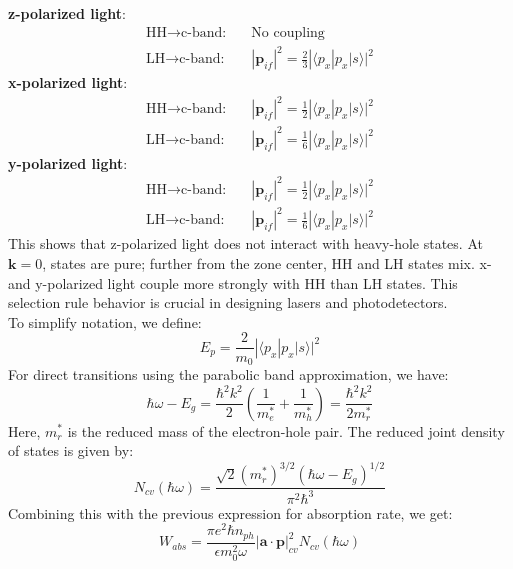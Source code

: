 \textbf{z-polarized light}:
\begin{align*}
	\text{HH} \rightarrow \text{c-band:} & \quad \text{No coupling}                                                  \\
	\text{LH} \rightarrow \text{c-band:} & \quad |\mathbf{p}_{if}|^2 = \frac{2}{3} |\langle p_x | p_x | s \rangle|^2
\end{align*}
\textbf{x-polarized light}:
\begin{align}
	\text{HH} \rightarrow \text{c-band:} & \quad |\mathbf{p}_{if}|^2 = \frac{1}{2} |\langle p_x | p_x | s \rangle|^2 \\
	\text{LH} \rightarrow \text{c-band:} & \quad |\mathbf{p}_{if}|^2 = \frac{1}{6} |\langle p_x | p_x | s \rangle|^2
\end{align}
\textbf{y-polarized light}:
\begin{align*}
	\text{HH} \rightarrow \text{c-band:} & \quad |\mathbf{p}_{if}|^2 = \frac{1}{2} |\langle p_x | p_x | s \rangle|^2 \\
	\text{LH} \rightarrow \text{c-band:} & \quad |\mathbf{p}_{if}|^2 = \frac{1}{6} |\langle p_x | p_x | s \rangle|^2
\end{align*}
This shows that z-polarized light does not interact with heavy-hole states. At \( \mathbf{k} = 0 \), states are pure; further from the zone center, HH and LH states mix. x- and y-polarized light couple more strongly with HH than LH states. This selection rule behavior is crucial in designing lasers and photodetectors.\\
To simplify notation, we define:
\begin{equation}
	E_p = \frac{2}{m_0} |\langle p_x | p_x | s \rangle|^2
\end{equation}
For direct transitions using the parabolic band approximation, we have:
\begin{equation}
	\hbar \omega - E_g = \frac{\hbar^2 k^2}{2} \left( \frac{1}{m_e^*} + \frac{1}{m_h^*} \right) = \frac{\hbar^2 k^2}{2 m_r^*}
\end{equation}
Here, \( m_r^* \) is the reduced mass of the electron-hole pair.
The reduced joint density of states is given by:
\begin{equation}
	N_{cv}(\hbar \omega) = \frac{\sqrt{2} (m_r^*)^{3/2} (\hbar \omega - E_g)^{1/2}}{\pi^2 \hbar^3}
\end{equation}
Combining this with the previous expression for absorption rate, we get:
\begin{equation}
	W_{abs} = \frac{\pi e^2 \hbar n_{ph}}{\epsilon m_0^2 \omega} |\mathbf{a} \cdot \mathbf{p}|_{cv}^2 N_{cv}(\hbar \omega)
\end{equation}
